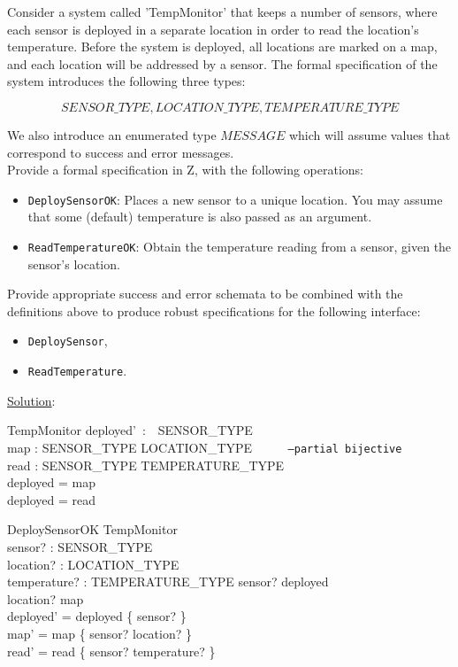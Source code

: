 \documentclass[12pt]{article}
\begin{document}
Consider a system called 'TempMonitor' that keeps a number of sensors, where each sensor is deployed in a separate location in order to read the location's temperature. Before the system is deployed, all locations are marked on a map, and each location will be addressed by a sensor. The formal specification of the system introduces the following three types:

\[ SENSOR\_TYPE,  LOCATION\_TYPE, TEMPERATURE\_TYPE  \]

\noindent We also introduce an enumerated type $MESSAGE$ which will assume values that correspond to success and error messages.\\

\noindent Provide a formal specification in Z, with the following operations:

\begin{itemize}
	\item \texttt{DeploySensorOK}:  Places a new sensor to a unique location. You may assume that some (default) temperature is also passed as an argument.
	\item \texttt{ReadTemperatureOK}: Obtain the temperature reading from a sensor, given the sensor's location.
\end{itemize}

\noindent Provide appropriate success and error schemata to be combined with the definitions above to produce robust specifications for the following interface:

\begin{itemize}
	\item \texttt{DeploySensor},
	\item \texttt{ReadTemperature}.
\end{itemize}

\newpage

\noindent \underline{Solution}:

\begin{schema}{TempMonitor}
deployed'~:~~SENSOR\_TYPE\\
map : SENSOR\_TYPE \nrightarrow LOCATION\_TYPE \texttt{~~~~~--partial bijective}\\
read : SENSOR\_TYPE  \nrightarrow TEMPERATURE\_TYPE\\
\where
deployed = \dom map\\
deployed = \dom read
\end{schema}

\begin{schema}{DeploySensorOK}
\Delta TempMonitor\\
sensor? : SENSOR\_TYPE\\
location? : LOCATION\_TYPE\\
temperature? : TEMPERATURE\_TYPE
\where
sensor? \notin deployed\\
location? \notin \ran map\\
deployed' = deployed \cup \{ sensor? \}\\
map' = map \cup \{ sensor? \mapsto location? \}\\
read' = read \cup \{ sensor? \mapsto temperature? \}
\end{schema}
\end{document}
